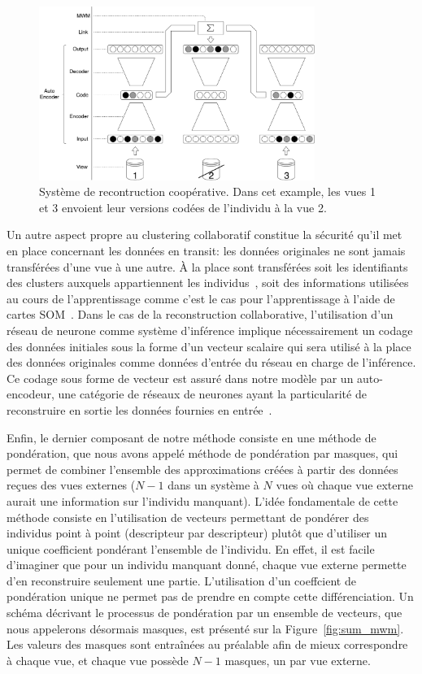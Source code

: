 \documentclass[a4paper]{article}
\begin{document}
	\begin{figure}[H]
		\centering
        \includegraphics[width=0.8\textwidth]{img/base_system.pdf}
        \caption{Système de recontruction coopérative. Dans cet example, les vues 1 et 3 envoient leur versions codées de l'individu à la vue 2.}
\label{fig:sum_base}
	\end{figure}

    Un autre aspect propre au clustering collaboratif constitue la sécurité qu'il met en place concernant les données en transit: les données originales ne sont jamais transférées d'une vue à une autre. À la place sont transférées soit les identifiants des clusters auxquels appartiennent les individus~\cite{sublime2016collaborative,Sublime2015}, soit des informations utilisées au cours de l'apprentissage comme c'est le cas pour l'apprentissage à l'aide de cartes SOM~\cite{ghassany2012collaborative,maurel2017incremental}. Dans le cas de la reconstruction collaborative, l'utilisation d'un réseau de neurone comme système d'inférence implique nécessairement un codage des données initiales sous la forme d'un vecteur scalaire qui sera utilisé à la place des données originales comme données d'entrée du réseau en charge de l'inférence. Ce codage sous forme de vecteur est assuré dans notre modèle par un auto-encodeur, une catégorie de réseaux de neurones ayant la particularité de reconstruire en sortie les données fournies en entrée~\cite{vincent2008extracting}. 

    Enfin, le dernier composant de notre méthode consiste en une méthode de pondération, que nous avons appelé méthode de pondération par masques, qui permet de combiner l'ensemble des approximations créées à partir des données reçues des vues externes ($N-1$ dans un système à $N$ vues où chaque vue externe aurait une information sur l'individu manquant). L'idée fondamentale de cette méthode consiste en l'utilisation de vecteurs permettant de pondérer des individus point à point (descripteur par descripteur) plutôt que d'utiliser un unique coefficient pondérant l'ensemble de l'individu. En effet, il est facile d'imaginer que pour un individu manquant donné, chaque vue externe permette d'en reconstruire seulement une partie. L'utilisation d'un coeffcient de pondération unique ne permet pas de prendre en compte cette différenciation. Un schéma décrivant le processus de pondération par un ensemble de vecteurs, que nous appelerons désormais masques, est présenté sur la Figure~\ref{fig:sum_mwm}. Les valeurs des masques sont entraînées au préalable afin de mieux correspondre à chaque vue, et chaque vue possède $N-1$ masques, un par vue externe.
\end{document}
